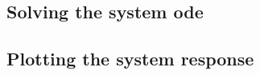 \subsection{Solving the system \acs{ode}}
\label{sec:code_ideal_fs_ode}


\subsection{Plotting the system response}
\label{sec:code_ideal_fs_plot}

